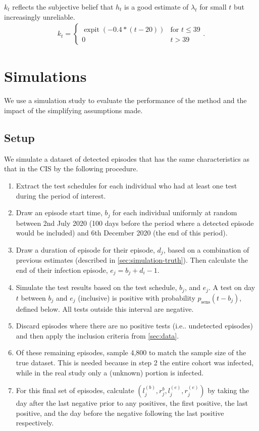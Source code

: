 \documentclass[12pt]{article}
\makeatletter
\DeclareMathOperator{\expit}{expit}
\newcommand{\psens}{p_\text{sens}}
\DeclareRobustCommand\onedot{\futurelet\@let@token\@onedot}
\def\@onedot{\ifx\@let@token.\else.\null\fi\xspace}
\def\ie{i.e\onedot} \def\Ie{{I.e}\onedot}
\makeatother
\begin{document}
$k_t$ reflects the subjective belief that $h_t$ is a good estimate of $\lambda_t$ for small $t$ but increasingly unreliable.
\begin{align}
k_t = \begin{cases}
  \expit(-0.4 * (t - 20)) &\text{for $t \leq 39$} \\
  0 &t > 39
\end{cases}.
\end{align}

\section{Simulations} \label{sec:simulation}


We use a simulation study to evaluate the performance of the method and the impact of the simplifying assumptions made.

\subsection{Setup}

We simulate a dataset of detected episodes that has the same characteristics as that in the CIS by the following procedure.
\begin{enumerate}
    \item Extract the test schedules for each individual who had at least one test during the period of interest.
    \item Draw an episode start time, $b_{j}$ for each individual uniformly at random between 2nd July 2020 (100 days before the period where a detected episode would be included) and 6th December 2020 (the end of this period).
    \item Draw a duration of episode for their episode, $d_j$, based on a combination of previous estimates (described in \cref{sec:simulation-truth}). Then calculate the end of their infection episode, $e_{j} = b_{j} + d_i - 1$.
    \item Simulate the test results based on the test schedule, $b_{j}$, and $e_{j}$. A test on day $t$ between $b_{j}$ and $e_{j}$ (inclusive) is positive with probability $\psens(t - b_j)$, defined below. All tests outside this interval are negative.
    \item Discard episodes where there are no positive tests (\ie undetected episodes) and then apply the inclusion criteria from \cref{sec:data}.
    \item Of these remaining episodes, sample 4,800 to match the sample size of the true dataset. This is needed because in step 2 the entire cohort was infected, while in the real study only a (unknown) portion is infected.
    \item For this final set of episodes, calculate $(l_j^{(b)}, r_j^{b}, l_j^{(e)}, r_j^{(e)})$ by taking the day after the last negative prior to any positives, the first positive, the last positive, and the day before the negative following the last positive respectively.
\end{enumerate}
\end{document}

